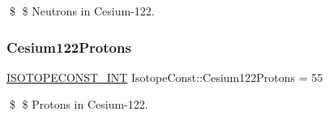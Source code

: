 \$ \$ Neutrons in Cesium-\/122. \mbox{\label{group___isotope_const-_cesium-_cs122_ga236af590a915b595bcb0cf8f0ecc5c2a}} 
\subsubsection{\texorpdfstring{Cesium122\+Protons}{Cesium122Protons}}
{\footnotesize\ttfamily \mbox{\hyperlink{group___isotope_const-_macros_ga5f18360b3e99483a35c32d789e62621c}{I\+S\+O\+T\+O\+P\+E\+C\+O\+N\+S\+T\+\_\+\+I\+NT}} Isotope\+Const\+::\+Cesium122\+Protons = 55}

\$ \$ Protons in Cesium-\/122. 